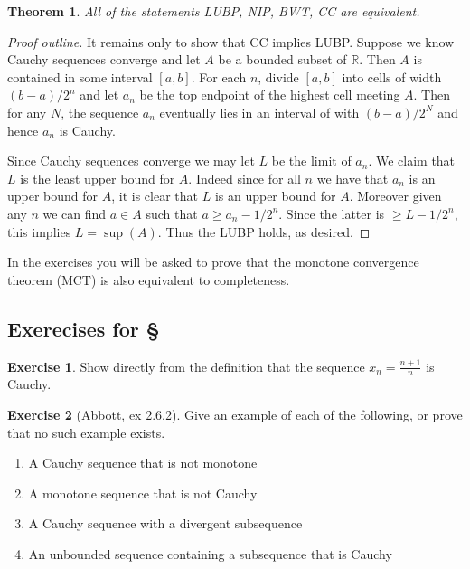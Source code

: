 \documentclass[11pt,oneside]{amsbook}
\newcommand{\RR}{\mathbb R}
\theoremstyle{definition}
\newtheorem{exerc}{Exercise}[section]
\theoremstyle{plain}
\newtheorem{thm}{Theorem}[section]
\theoremstyle{definition}
\theoremstyle{remark}
\numberwithin{equation}{section}
\numberwithin{figure}{section}
\begin{document}
\begin{thm}
  All of the statements LUBP, NIP, BWT, CC are equivalent.
\end{thm}

\begin{proof}[Proof outline]
  It remains only to show that CC implies LUBP. Suppose we know Cauchy sequences converge and let $A$ be a bounded subset of $\RR$. Then $A$ is contained in some interval $[a,b]$. For each $n$, divide $[a,b]$ into cells of width $(b-a)/2^n$ and let $a_n$ be the top endpoint of the highest cell meeting $A$. Then for any $N$, the sequence $a_n$ eventually lies in an interval of with $(b-a)/2^N$ and hence $a_n$ is Cauchy.

  Since Cauchy sequences converge we may let $L$ be the limit of $a_n$. We claim that $L$ is the least upper bound for $A$. Indeed since for all $n$ we have that $a_n$ is an upper bound for $A$, it is clear that $L$ is an upper bound for $A$. Moreover given any $n$ we can find $a\in A$ such that $a\geq a_n-1/2^n$. Since the latter is $\geq L-1/2^n$, this implies $L=\sup(A)$. Thus the LUBP holds, as desired.
\end{proof}

In the exercises you will be asked to prove that the monotone convergence theorem (MCT) is also equivalent to completeness.

\newpage
\subsection*{Exerecises for \S \thesection}

\begin{exerc}
  Show directly from the definition that the sequence $x_n=\frac{n+1}{n}$ is Cauchy.
\end{exerc}

\begin{exerc}[Abbott, ex 2.6.2]
  Give an example of each of the following, or prove that no such example exists.
  \begin{enumerate}
    \item A Cauchy sequence that is not monotone
    \item A monotone sequence that is not Cauchy
    \item A Cauchy sequence with a divergent subsequence
    \item An unbounded sequence containing a subsequence that is Cauchy
  \end{enumerate}
\end{exerc}
\end{document}
